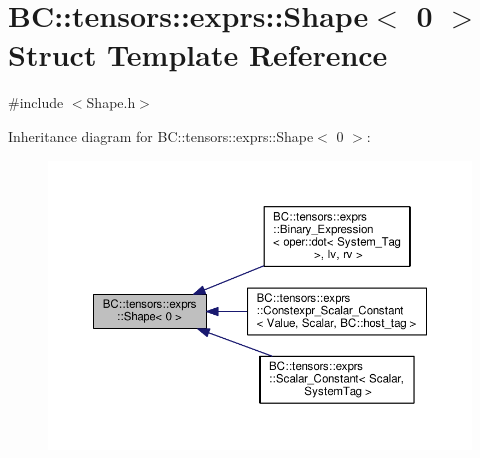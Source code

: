 \hypertarget{structBC_1_1tensors_1_1exprs_1_1Shape_3_010_01_4}{}\section{BC\+:\+:tensors\+:\+:exprs\+:\+:Shape$<$ 0 $>$ Struct Template Reference}
\label{structBC_1_1tensors_1_1exprs_1_1Shape_3_010_01_4}


{\ttfamily \#include $<$Shape.\+h$>$}



Inheritance diagram for BC\+:\+:tensors\+:\+:exprs\+:\+:Shape$<$ 0 $>$\+:
\nopagebreak
\begin{figure}[H]
\begin{center}
\leavevmode
\includegraphics[width=350pt]{structBC_1_1tensors_1_1exprs_1_1Shape_3_010_01_4__inherit__graph}
\end{center}
\end{figure}
